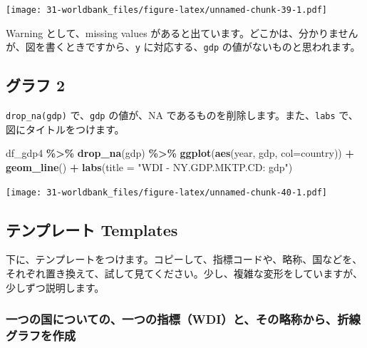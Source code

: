 \documentclass[
  xelatex, ja=standard]{bxjsbook}
\newenvironment{Shaded}{\begin{snugshade}}{\end{snugshade}}
\newcommand{\AttributeTok}[1]{\textcolor[rgb]{0.13,0.29,0.53}{#1}}
\newcommand{\FunctionTok}[1]{\textcolor[rgb]{0.13,0.29,0.53}{\textbf{#1}}}
\newcommand{\NormalTok}[1]{#1}
\newcommand{\SpecialCharTok}[1]{\textcolor[rgb]{0.81,0.36,0.00}{\textbf{#1}}}
\newcommand{\StringTok}[1]{\textcolor[rgb]{0.31,0.60,0.02}{#1}}
\theoremstyle{definition}
\theoremstyle{definition}
\theoremstyle{definition}
\theoremstyle{definition}
\theoremstyle{remark}
\begin{document}
\texttt{[image: 31-worldbank\_files/figure-latex/unnamed-chunk-39-1.pdf]}

Warning として、missing values があると出ています。どこかは、分かりませんが、図を書くときですから、\texttt{y} に対応する、\texttt{gdp} の値がないものと思われます。

\hypertarget{ux30b0ux30e9ux30d5-2}{%
\subsection{グラフ 2}\label{ux30b0ux30e9ux30d5-2}}

\texttt{drop\_na(gdp)} で、\texttt{gdp} の値が、NA であるものを削除します。また、\texttt{labs} で、図にタイトルをつけます。

\begin{Shaded}
\begin{Highlighting}[]
\NormalTok{df\_gdp4 }\SpecialCharTok{\%\textgreater{}\%} \FunctionTok{drop\_na}\NormalTok{(gdp) }\SpecialCharTok{\%\textgreater{}\%} 
  \FunctionTok{ggplot}\NormalTok{(}\FunctionTok{aes}\NormalTok{(year, gdp, }\AttributeTok{col=}\NormalTok{country)) }\SpecialCharTok{+} \FunctionTok{geom\_line}\NormalTok{() }\SpecialCharTok{+}
  \FunctionTok{labs}\NormalTok{(}\AttributeTok{title =} \StringTok{"WDI {-} NY.GDP.MKTP.CD: gdp"}\NormalTok{)}
\end{Highlighting}
\end{Shaded}

\texttt{[image: 31-worldbank\_files/figure-latex/unnamed-chunk-40-1.pdf]}

\hypertarget{ux30c6ux30f3ux30d7ux30ecux30fcux30c8-templates}{%
\subsection{テンプレート Templates}\label{ux30c6ux30f3ux30d7ux30ecux30fcux30c8-templates}}

下に、テンプレートをつけます。コピーして、指標コードや、略称、国などを、それぞれ置き換えて、試して見てください。少し、複雑な変形をしていますが、少しずつ説明します。

\hypertarget{ux4e00ux3064ux306eux56fdux306bux3064ux3044ux3066ux306eux4e00ux3064ux306eux6307ux6a19wdiux3068ux305dux306eux7565ux79f0ux304bux3089ux6298ux7ddaux30b0ux30e9ux30d5ux3092ux4f5cux6210}{%
\subsubsection{一つの国についての、一つの指標（WDI）と、その略称から、折線グラフを作成}\label{ux4e00ux3064ux306eux56fdux306bux3064ux3044ux3066ux306eux4e00ux3064ux306eux6307ux6a19wdiux3068ux305dux306eux7565ux79f0ux304bux3089ux6298ux7ddaux30b0ux30e9ux30d5ux3092ux4f5cux6210}}
\end{document}
